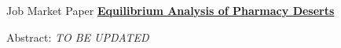 \documentclass{resume} %
\begin{document}
	\begin{rSection}{Job Market Paper}
		\href{chanwoolkim.github.io}{\textbf{Equilibrium Analysis of Pharmacy Deserts}}
		
		Abstract: \textit{TO BE UPDATED}
	\end{rSection}

		
		
		
\end{document}
